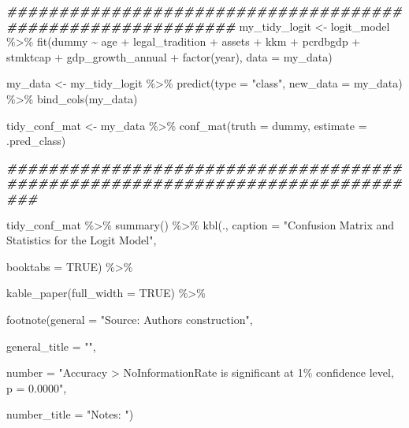 \documentclass[a4paper,nobind]{templates/ociamthesis}
\newenvironment{Shaded}{\begin{snugshade}}{\end{snugshade}}
\newcommand{\AttributeTok}[1]{\textcolor[rgb]{0.77,0.63,0.00}{#1}}
\newcommand{\ConstantTok}[1]{\textcolor[rgb]{0.00,0.00,0.00}{#1}}
\newcommand{\DocumentationTok}[1]{\textcolor[rgb]{0.56,0.35,0.01}{\textbf{\textit{#1}}}}
\newcommand{\FunctionTok}[1]{\textcolor[rgb]{0.00,0.00,0.00}{#1}}
\newcommand{\NormalTok}[1]{#1}
\newcommand{\OtherTok}[1]{\textcolor[rgb]{0.56,0.35,0.01}{#1}}
\newcommand{\SpecialCharTok}[1]{\textcolor[rgb]{0.00,0.00,0.00}{#1}}
\newcommand{\StringTok}[1]{\textcolor[rgb]{0.31,0.60,0.02}{#1}}
\renewenvironment{Shaded}
{
  \vspace{10pt}%
  \begin{snugshade}%
}{%
  \end{snugshade}%
  \vspace{8pt}%
}
\begin{document}
\begin{Shaded}
\begin{Highlighting}[]
\DocumentationTok{\#\#\#\#\#\#\#\#\#\#\#\#\#\#\#\#\#\#\#\#\#\#\#\#\#\#\#\#\#\#\#\#\#\#\#\#\#\#\#\#\#\#\#\#\#\#\#\#\#\#\#\#\#\#\#\#\#\#\#\#}
\NormalTok{my\_tidy\_logit }\OtherTok{\textless{}{-}}\NormalTok{ logit\_model }\SpecialCharTok{\%\textgreater{}\%} \FunctionTok{fit}\NormalTok{(dummy }\SpecialCharTok{\textasciitilde{}}\NormalTok{ age }\SpecialCharTok{+}\NormalTok{ legal\_tradition }\SpecialCharTok{+} 
\NormalTok{       assets }\SpecialCharTok{+}\NormalTok{ kkm }\SpecialCharTok{+}\NormalTok{ pcrdbgdp }\SpecialCharTok{+}\NormalTok{ stmktcap }\SpecialCharTok{+}\NormalTok{ gdp\_growth\_annual }\SpecialCharTok{+} \FunctionTok{factor}\NormalTok{(year), }
       \AttributeTok{data =}\NormalTok{ my\_data)}

\NormalTok{my\_data }\OtherTok{\textless{}{-}}\NormalTok{ my\_tidy\_logit }\SpecialCharTok{\%\textgreater{}\%} \FunctionTok{predict}\NormalTok{(}\AttributeTok{type =} \StringTok{"class"}\NormalTok{, }\AttributeTok{new\_data =}\NormalTok{ my\_data) }\SpecialCharTok{\%\textgreater{}\%} \FunctionTok{bind\_cols}\NormalTok{(my\_data)}

\NormalTok{tidy\_conf\_mat }\OtherTok{\textless{}{-}}\NormalTok{ my\_data }\SpecialCharTok{\%\textgreater{}\%} \FunctionTok{conf\_mat}\NormalTok{(}\AttributeTok{truth =}\NormalTok{ dummy, }\AttributeTok{estimate =}\NormalTok{ .pred\_class)}

\DocumentationTok{\#\#\#\#\#\#\#\#\#\#\#\#\#\#\#\#\#\#\#\#\#\#\#\#\#\#\#\#\#\#\#\#\#\#\#\#\#\#\#\#\#\#\#\#\#\#\#\#\#\#\#\#\#\#\#\#\#\#\#\#\#\#\#\#\#\#\#\#\#\#\#\#\#\#\#\#\#\#\#}

\NormalTok{tidy\_conf\_mat }\SpecialCharTok{\%\textgreater{}\%} \FunctionTok{summary}\NormalTok{() }\SpecialCharTok{\%\textgreater{}\%} \FunctionTok{kbl}\NormalTok{(., }\AttributeTok{caption =} \StringTok{"Confusion Matrix and Statistics for the Logit Model"}\NormalTok{, }
      
      \AttributeTok{booktabs =} \ConstantTok{TRUE}\NormalTok{) }\SpecialCharTok{\%\textgreater{}\%} 
  
  \FunctionTok{kable\_paper}\NormalTok{(}\AttributeTok{full\_width =} \ConstantTok{TRUE}\NormalTok{) }\SpecialCharTok{\%\textgreater{}\%} 
  
  \FunctionTok{footnote}\NormalTok{(}\AttributeTok{general =} \StringTok{"Source: Authors\textquotesingle{} construction"}\NormalTok{,}
           
           \AttributeTok{general\_title =} \StringTok{""}\NormalTok{, }
           
           \AttributeTok{number =} \StringTok{"Accuracy \textgreater{} NoInformationRate is significant at 1\% confidence level, p = 0.0000"}\NormalTok{,}
  
  \AttributeTok{number\_title =} \StringTok{"Notes: "}\NormalTok{)}
\end{Highlighting}
\end{Shaded}
\end{document}
